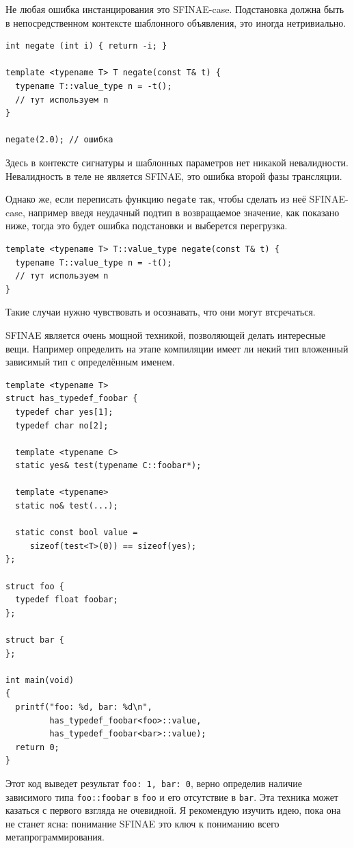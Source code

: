 \documentclass[a4paper,12pt,oneside]{article}
\begin{document}
Не любая ошибка инстанцирования это SFINAE-case. Подстановка должна быть в непосредственном контексте шаблонного объявления, это иногда нетривиально.

\begin{lstlisting}
int negate (int i) { return -i; }

template <typename T> T negate(const T& t) {
  typename T::value_type n = -t();
  // тут используем n
} 

negate(2.0); // ошибка
\end{lstlisting}

Здесь в контексте сигнатуры и шаблонных параметров нет никакой невалидности. Невалидность в теле не является SFINAE, это ошибка второй фазы трансляции.

Однако же, если переписать функцию \lstinline!negate! так, чтобы сделать из неё SFINAE-case, например введя неудачный подтип в возвращаемое значение, как показано ниже, тогда это будет ошибка подстановки и выберется перегрузка.

\begin{lstlisting}
template <typename T> T::value_type negate(const T& t) {
  typename T::value_type n = -t();
  // тут используем n
} 
\end{lstlisting}

Такие случаи нужно чувствовать и осознавать, что они могут втсречаться.

SFINAE является очень мощной техникой, позволяющей делать интересные вещи. Например определить на этапе компиляции имеет ли некий тип вложенный зависимый тип с определённым именем.

\begin{lstlisting}
template <typename T>
struct has_typedef_foobar {
  typedef char yes[1];
  typedef char no[2];
 
  template <typename C>
  static yes& test(typename C::foobar*);
 
  template <typename>
  static no& test(...);
 
  static const bool value = 
     sizeof(test<T>(0)) == sizeof(yes);
};

struct foo {    
  typedef float foobar;
};

struct bar {    
};

int main(void)
{
  printf("foo: %d, bar: %d\n", 
         has_typedef_foobar<foo>::value,
         has_typedef_foobar<bar>::value);
  return 0;
}
\end{lstlisting}

Этот код выведет результат \lstinline!foo: 1, bar: 0!, верно определив наличие зависимого типа \lstinline!foo::foobar! в \lstinline!foo! и его отсутствие в \lstinline!bar!. Эта техника может казаться с первого взгляда не очевидной. Я рекомендую изучить идею, пока она не станет ясна: понимание SFINAE это ключ к пониманию всего метапрограммирования.
\end{document}
